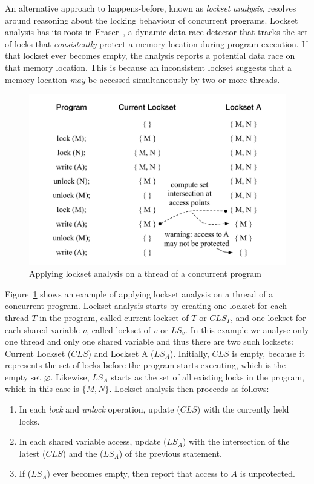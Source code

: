 An alternative approach to happens-before, known as \emph{lockset analysis}, resolves around reasoning about the locking behaviour of concurrent programs. Lockset analysis has its roots in Eraser~\cite{savage1997eraser}, a dynamic data race detector that tracks the set of locks that \emph{consistently} protect a memory location during program execution. If that lockset ever becomes empty, the analysis reports a potential data race on that memory location. This is because an inconsistent lockset suggests that a memory location \emph{may} be accessed simultaneously by two or more threads.

\begin{figure}[htbp]
\centering
\includegraphics[width=1\linewidth]{img/lockset.pdf}
\caption{Applying lockset analysis on a thread of a concurrent program}
\label{fig:locksets}
\end{figure}

Figure~\ref{fig:locksets} shows an example of applying lockset analysis on a thread of a concurrent program. Lockset analysis starts by creating one lockset for each thread $T$ in the program, called current lockset of $T$ or $CLS_T$, and one lockset for each shared variable $v$, called lockset of $v$ or $LS_v$. In this example we analyse only one thread and only one shared variable and thus there are two such locksets: Current Lockset ($CLS$) and Lockset A ($LS_A$). Initially, $CLS$ is empty, because it represents the set of locks before the program starts executing, which is the empty set $\varnothing$. Likewise, $LS_A$ starts as the set of all existing locks in the program, which in this case is $\{M, N\}$. Lockset analysis then proceeds as follows:

\begin{enumerate}
\item In each \emph{lock} and \emph{unlock} operation, update ($CLS$) with the currently held locks.
\item In each shared variable access, update ($LS_A$) with the intersection of the latest ($CLS$) and the ($LS_A$) of the previous statement.
\item If ($LS_A$) ever becomes empty, then report that access to $A$ is unprotected.
\end{enumerate}

